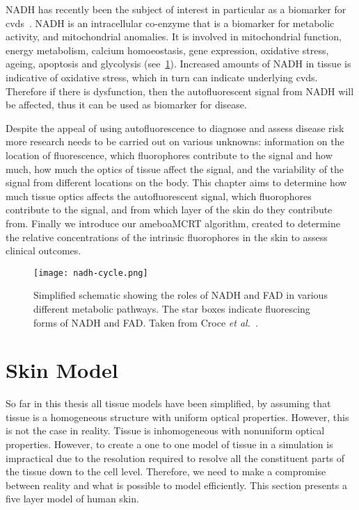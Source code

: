 NADH has recently been the subject of interest in particular as a biomarker for \gls*{cvds}~\cite{akbar2014vivo,elahi2009oxidative,blacker2016investigating}.
NADH is an intracellular co-enzyme that is a biomarker for metabolic activity, and mitochondrial anomalies. 
It is involved in mitochondrial function, energy metabolism, calcium homoeostasis, gene expression, oxidative stress, ageing, apoptosis and glycolysis (see~\cref{fig:nadhfadpath}).
Increased amounts of NADH in tissue is indicative of oxidative stress, which in turn can indicate underlying \gls*{cvds}.
Therefore if there is dysfunction, then the autofluorescent signal from NADH will be affected, thus it can be used as biomarker for disease.

Despite the appeal of using autofluorescence to diagnose and assess disease risk more research needs to be carried out on various unknowns: information on the location of fluorescence, which fluorophores contribute to the signal and how much, how much the optics of tissue affect the signal, and the variability of the signal from different locations on the body.
This chapter aims to determine how much tissue optics affects the autofluorescent signal, which fluorophores contribute to the signal, and from which layer of the skin do they contribute from.
Finally we introduce our ameboaMCRT algorithm, created to determine the relative concentrations of the intrinsic fluorophores in the skin to assess clinical outcomes.


\begin{figure}[!htpb]
  \centering
  \texttt{[image: nadh-cycle.png]}
  \caption{Simplified schematic showing the roles of NADH and FAD in various different metabolic pathways. The star boxes indicate fluorescing forms of NADH and FAD. Taken from Croce \textit{et al.}~\cite{croce2014autofluorescence}.}
  \label{fig:nadhfadpath}
\end{figure}


\FloatBarrier

\section{Skin Model}

So far in this thesis all tissue models have been simplified, by assuming that tissue is a homogeneous structure with uniform optical properties.
However, this is not the case in reality.
Tissue is inhomogeneous with nonuniform optical properties.
However, to create a one to one model of tissue in a simulation is impractical due to the resolution required to resolve all the constituent parts of the tissue down to the cell level.
Therefore, we need to make a compromise between reality and what is possible to model efficiently.
This section presents a five layer model of human skin. 

